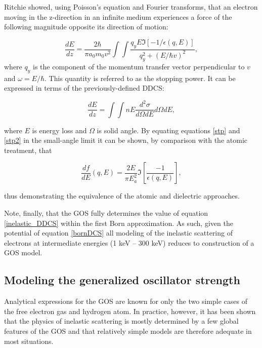 \documentclass [11pt, proquest, article] {uwthesis}[2016/11/22]
\begin{document}
Ritchie showed, using Poisson's equation and Fourier transforms, that an electron moving in the z-direction in an infinite medium experiences a force of the following magnitude opposite its direction of motion: 


\begin{equation} \label{stp}
\frac{dE}{dz} = \frac{2\hbar}{\pi a_0 m_0 v^2} \int \int \frac{q_y E \Im[-1/\epsilon(q, E)]}{q_y^2 + (E/\hbar v)^2},
\end{equation}
where $q_y$ is the component of the momentum transfer vector perpendicular to $v$ and $\omega = E/\hbar$.\cite{ritchie1957plasma} This quantity is referred to as the stopping power. It can be expressed in terms of the previously-defined DDCS:

\begin{equation} \label{stp2}
\frac{dE}{dz} = \int \int n E \frac{d^2\sigma}{d\Omega dE} d\Omega dE,
\end{equation}

where $E$ is energy loss and $\Omega$ is solid angle. By equating equations \ref{stp} and \ref{stp2} in the small-angle limit it can be shown, by comparison with the atomic treatment, that 

$$
\frac{df}{dE}(q, E) = \frac{2E}{\pi E_a^2} \Im[\frac{-1}{\epsilon(q, E)}],
$$

thus demonstrating the equivalence of the atomic and dielectric approaches.

Note, finally, that the GOS fully determines the value of equation \ref{inelastic_DDCS} within the first Born approximation. As such, given the potential of equation \ref{bornDCS} all modeling of the inelastic scattering of electrons at intermediate energies (1 keV -- 300 keV) reduces to construction of a GOS model. 




\subsection{Modeling the generalized oscillator strength}
Analytical expressions for the GOS are known for only the two simple cases of the free electron gas and hydrogen atom. In practice, however, it has been shown that the physics of inelastic scattering is mostly determined by a few global features of the GOS and that relatively simple models are therefore adequate in most situations.\cite{salvat1992semiempirical}
\end{document}
